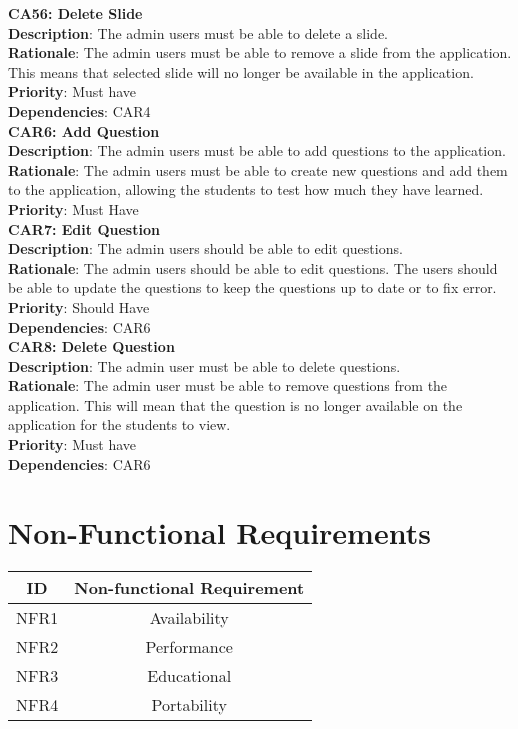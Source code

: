 \documentclass{l3proj}
\begin{document}
\textbf{CA56: Delete Slide}\\
\textbf{Description}: The admin users must be able to delete a slide.\\ 
\textbf{Rationale}: The admin users must be able to remove a slide from the application. This means that selected slide will no longer be available in the application.\\
\textbf{Priority}: Must have\\
\textbf{Dependencies}: CAR4\\

\textbf{CAR6: Add Question}\\
\textbf{Description}: The admin users must be able to add questions to the application. \\
\textbf{Rationale}: The admin users must be able to create new questions and add them to the application, allowing the students to test how much they have learned.\\
\textbf{Priority}: Must Have\\

\textbf{CAR7: Edit Question}\\
\textbf{Description}: The admin users should be able to edit questions.\\
\textbf{Rationale}: The admin users should be able to edit questions. The users should be able to update the questions to keep the questions up to date or to fix error.\\
\textbf{Priority}: Should Have \\
\textbf{Dependencies}: CAR6\\

\textbf{CAR8: Delete Question}\\
\textbf{Description}: The admin user must be able to delete questions. \\
\textbf{Rationale}:  The admin user must be able to remove questions from the application. This will mean that the question is no longer available on the application for the students to view.\\
\textbf{Priority}: Must have\\
\textbf{Dependencies}: CAR6\\

\section{Non-Functional Requirements}

\begin{center}
\begin{tabular}{|c|c|}
\hline \textbf{ID} & \textbf{Non-functional Requirement}\\
\hline NFR1 & Availability\\
\hline NFR2 & Performance\\
\hline NFR3 & Educational\\
\hline NFR4 & Portability\\
\hline
\end{tabular}
\end{center}
\end{document}
